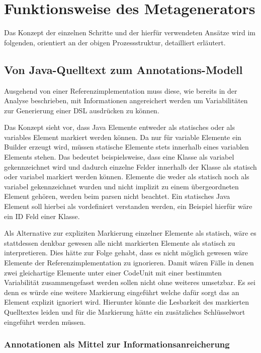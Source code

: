 \documentclass[12pt,oneside,a4paper,parskip]{scrbook}
\begin{document}
\section{Funktionsweise des Metagenerators}

Das Konzept der einzelnen Schritte und der hierfür verwendeten Ansätze wird im folgenden, orientiert an der obigen Prozessstruktur, detailliert erläutert.

\subsection{Von Java-Quelltext zum Annotations-Modell}

Ausgehend von einer Referenzimplementation muss diese, wie bereits in der Analyse beschrieben, mit Informationen angereichert werden um Variabilitäten zur Generierung einer DSL ausdrücken zu können.

Das Konzept sieht vor, dass Java Elemente entweder als statisches oder als variables Element markiert werden können. Da nur für variable Elemente ein Builder erzeugt wird, müssen statische Elemente stets innerhalb eines variablen Elements stehen. Das bedeutet beispielsweise, dass eine Klasse als variabel gekennzeichnet wird und dadurch einzelne Felder innerhalb der Klasse als statisch oder variabel markiert werden können. Elemente die weder als statisch noch als variabel gekennzeichnet wurden und nicht implizit zu einem übergeordneten Element gehören, werden beim parsen nicht beachtet. Ein statisches Java Element soll hierbei als vordefiniert verstanden werden, ein Beispiel hierfür wäre ein ID Feld einer Klasse.

Als Alternative zur expliziten Markierung einzelner Elemente als statisch, wäre es stattdessen denkbar gewesen alle nicht markierten Elemente als statisch zu interpretieren. Dies hätte zur Folge gehabt, dass es nicht möglich gewesen wäre Elemente der Referenzimplementation zu ignorieren. Damit wären Fälle in denen zwei gleichartige Elemente unter einer CodeUnit mit einer bestimmten Variabilität zusammengefasst werden sollen nicht ohne weiteres umsetzbar. Es sei denn es würde eine weitere Markierung eingeführt welche dafür sorgt das an Element explizit ignoriert wird. Hierunter könnte die Lesbarkeit des markierten Quelltextes leiden und für die Markierung hätte ein zusätzliches Schlüsselwort eingeführt werden müssen.

\subsubsection{Annotationen als Mittel zur Informationsanreicherung}
\end{document}
